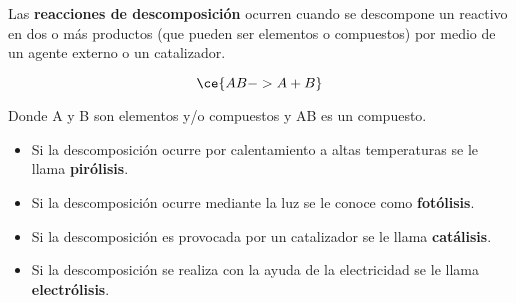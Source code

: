 \begin{warncard}[adjusted title={Reacción de descomposición}]
    Las \textbf{reacciones de descomposición} ocurren cuando se descompone un reactivo en dos o más productos (que pueden ser elementos o compuestos) por medio de un agente externo o un catalizador.

    \[\ce{AB -> A + B}\]

    Donde A y B son elementos y/o compuestos y AB es un compuesto.

    \begin{itemize}
        \item[\color{Red}\faIcon{gripfire}] Si la descomposición ocurre por calentamiento a altas temperaturas se le llama \textbf{\color{Red}pirólisis}.
        \item[\color{orange}\faIcon{sun}] Si la descomposición ocurre mediante la luz se le conoce como \textbf{\color{orange}fotólisis}.
        \item[\color{Brown}\faIcon{flask}] Si la descomposición es provocada por un catalizador se le llama \textbf{\color{Brown}catálisis}.
        \item[\color{Goldenrod}\faIcon{bolt}] Si la descomposición se realiza con la ayuda de la electricidad se le llama \textbf{\color{Goldenrod}electrólisis}.
    \end{itemize}
\end{warncard}